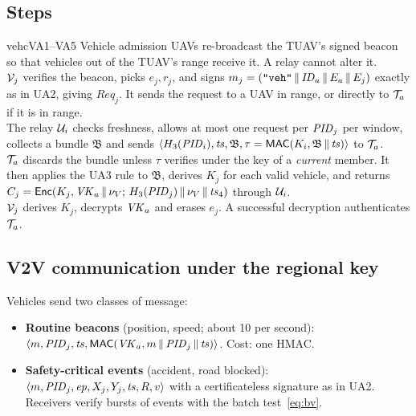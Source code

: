 \subsection{Steps}
\begin{stepbox}{vehc}{VA1--VA5 \;Vehicle admission}
 UAVs re-broadcast the TUAV's signed beacon so that vehicles out of the TUAV's range receive it. A relay cannot alter it.\\[2pt]
 $\mathcal{V}_j$ verifies the beacon, picks $e_j,r_j$, and signs $m_j=(\texttt{"veh"}\,\|\,\mathit{ID}_a\,\|\, E_a\,\|\, E_j)$ exactly as in UA2, giving
$\mathit{Req}_j$. It sends the request to a UAV in range, or directly to $\mathcal{T}_a$ if it is in range.\\[2pt]
 The relay $\mathcal{U}_i$ checks freshness, allows at most one request per $\mathit{PID}_j$ per window, collects a bundle $\mathfrak{B}$ and sends
$\langle H_3(\mathit{PID}_i),\mathit{ts},\mathfrak{B},\tau=\mathsf{MAC}(K_i,\mathfrak{B}\,\|\,\mathit{ts})\rangle$ to $\mathcal{T}_a$.\\[2pt]
 $\mathcal{T}_a$ discards the bundle unless $\tau$ verifies under the key of a \emph{current} member. It then applies the UA3 rule to
$\mathfrak{B}$, derives $K_j$ for each valid vehicle, and returns $C_j=\mathsf{Enc}(K_j,\mathit{VK}_a\,\|\,\nu_V;\,H_3(\mathit{PID}_j)\,\|\,\nu_V\,\|\,\mathit{ts}_4)$ through $\mathcal{U}_i$.\\[2pt]
 $\mathcal{V}_j$ derives $K_j$, decrypts $\mathit{VK}_a$ and erases $e_j$. A successful decryption authenticates $\mathcal{T}_a$.
\end{stepbox}

\subsection{V2V communication under the regional key}
Vehicles send two classes of message:
\begin{itemize}
  \item \textbf{Routine beacons} (position, speed; about 10 per second):\ $\langle m,\mathit{PID}_j,\mathit{ts},\mathsf{MAC}(\mathit{VK}_a,m\,\|\,\mathit{PID}_j\,\|\,\mathit{ts})\rangle$. Cost: one HMAC.
  \item \textbf{Safety-critical events} (accident, road blocked): $\langle m,\mathit{PID}_j,\mathit{ep},X_j,Y_j,\mathit{ts},R,v\rangle$ with a certificateless signature as in UA2.
        Receivers verify bursts of events with the batch test~\eqref{eq:bv}.
\end{itemize}

